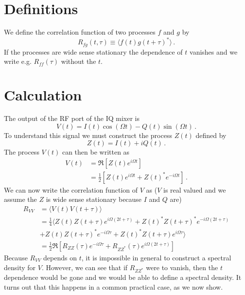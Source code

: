 \section{Definitions}

We define the correlation function of two processes $f$ and $g$ by
\begin{equation}
R_{fg}(t, \tau) \equiv  \langle f(t) g(t+\tau)^* \rangle \, .
\end{equation}
If the processes are wide sense stationary the dependence of $t$ vanishes and we write e.g. $R_{ff}(\tau)$ without the $t$.


\section{Calculation}

The output of the RF port of the IQ mixer is
\begin{equation}
V(t) = I(t) \cos(\Omega t) - Q(t) \sin(\Omega t) \, .
\end{equation}
To understand this signal we must construct the process $Z(t)$ defined by
\begin{equation}
Z(t) = I(t) + i Q(t) \, .
\end{equation}
The process $V(t)$ can then be written as
\begin{align}
V(t)
&= \Re \left[ Z(t) e^{i \Omega t} \right] \\
&= \frac{1}{2} \left[ Z(t) e^{i \Omega t} + Z(t)^* e^{-i \Omega t} \right] \, .
\end{align}
We can now write the correlation function of $V$ as ($V$ is real valued and we assume the $Z$ is wide sense stationary because $I$ and $Q$ are)
\begin{align}
R_{VV}
&= \langle V(t) V(t+\tau) \rangle \\
&= \frac{1}{4} \langle
Z(t)Z(t+\tau) e^{i\Omega (2t + \tau)}
+ Z(t)^* Z(t+\tau)^* e^{-i\Omega (2t + \tau)} \\
& + Z(t) Z(t+\tau)^* e^{-i \Omega \tau}
+ Z(t)^* Z(t+\tau) e^{i \Omega \tau}
\rangle \\
&= \frac{1}{2} \Re \left[ R_{ZZ}(\tau) e^{-i \Omega \tau}
+ R_{ZZ^*}(\tau) e^{i \Omega (2t + \tau)} \right]
\end{align}
Because $R_{VV}$ depends on $t$, it is impossible in general to construct a spectral density for $V$.
However, we can see that if $R_{ZZ^*}$ were to vanish, then the $t$ dependence would be gone and we would be able to define a spectral density.
It turns out that this happens in a common practical case, as we now show.


